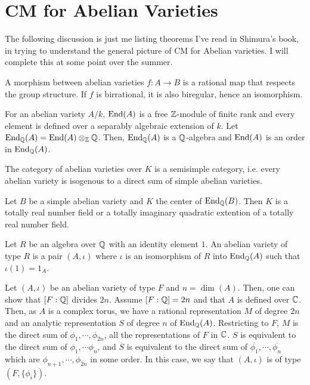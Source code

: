 \documentclass[12pt]{article}
\begin{document}
\section{CM for Abelian Varieties}
The following discussion is just me listing theorems I've read in Shimura's book, in trying to understand the general picture of CM for Abelian varieties. I will complete this at some point over the summer. 
\begin{definition}
    A morphism between abelian varieties $f: A \to B$ is a rational map that respects the group structure. If $f$ is birrational, it is also biregular, hence an isomorphism.
\end{definition}

\begin{definition}
    For an abelian variety $A/k$, $\operatorname{End}(A)$ is a free $\mathbb Z$-module of finite rank and every element is defined over a separably algebraic extension of $k$. Let $\operatorname{End}_\mathbb Q(A) = \operatorname{End}(A) \otimes_\mathbb Z \mathbb Q$. Then, $\operatorname{End}_\mathbb Q(A)$ is a $\mathbb Q$-algebra and $\operatorname{End}(A)$ is an order in $\operatorname{End}_\mathbb Q(A)$.
\end{definition}

The category of abelian varieties over $K$ is a semisimple category, i.e. every abelian variety is isogenous to a direct sum of simple abelian varieties.

\begin{prop}
    Let $B$ be a simple abelian variety and $K$ the center of $\operatorname{End}_\mathbb Q(B)$. Then $K$ is a totally real number field or a totally imaginary quadratic extention of a totally real number field.
\end{prop}

\begin{definition}
    Let $R$ be an algebra over $\mathbb Q$ with an identity element $1$. An abelian variety of type $R$ is a pair $(A, \iota)$ where $\iota$ is an isomorphism of $R$ into $\operatorname{End}_\mathbb Q(A)$ such that $\iota(1) = 1_A$.    
\end{definition}

Let $(A, \iota)$ be an abelian variety of type $F$ and $n = \dim(A)$. Then, one can show that $[F:\mathbb Q]$ divides $2n$. Assume $[F:\mathbb Q] = 2n$ and that $A$ is defined over $\mathbb C$. Then, as $A$ is a complex torus, we have a rational representation $M$ of degree $2n$ and an analytic representation $S$ of degree $n$ of $\operatorname{End}_\mathbb Q(A)$. Restricting to $F$, $M$ is the direct sum of $\phi_1, \cdots, \phi_{2n}$, all the representations of $F$ in $\mathbb C$. $S$ is equivalent to the direct sum of $\phi_1, \cdots \phi_n$, and $\overline{S}$ is equivalent to the direct sum of $\overline{\phi_1}, \cdots, \overline{\phi_n}$ which are $\phi_{n+1}, \cdots, \phi_{2n}$ in some order. In this case, we say that $(A, \iota)$ is of type $(F, \{\phi_i\})$.
\end{document}
